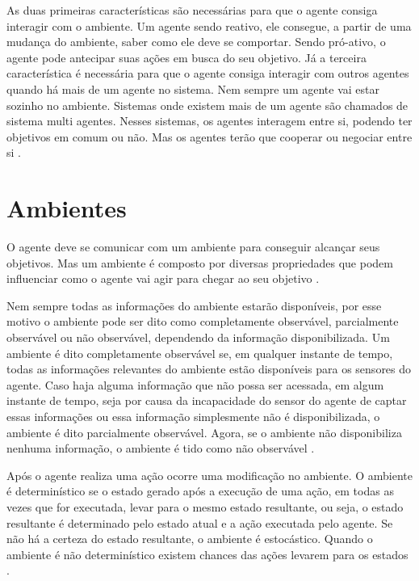 As duas primeiras características são necessárias para que o agente consiga interagir com o ambiente. Um agente sendo reativo, ele consegue, a partir de uma mudança do ambiente, saber como ele deve se comportar. Sendo pró-ativo, o agente pode antecipar suas ações em busca do seu objetivo.
Já a terceira característica é necessária para que o agente consiga interagir com outros agentes quando há mais de um agente no sistema. Nem sempre um agente vai estar sozinho no ambiente. Sistemas onde existem mais de um agente são chamados de sistema multi agentes. Nesses sistemas, os agentes interagem entre si, podendo ter objetivos em comum ou não. Mas os agentes terão que cooperar ou negociar entre si \cite{intelligence2003modern}.

\section{Ambientes}

O agente deve se comunicar com um ambiente para conseguir alcançar seus objetivos. Mas um ambiente é composto por diversas propriedades que podem influenciar como o agente vai agir para chegar ao seu objetivo \cite{intelligence2003modern}. 

Nem sempre todas as informações do ambiente estarão disponíveis, por esse motivo o ambiente pode ser dito como completamente observável, parcialmente observável ou não observável, dependendo da informação disponibilizada. Um ambiente é dito completamente observável se, em qualquer instante de tempo, todas as informações relevantes do ambiente estão disponíveis para os sensores do agente. Caso haja alguma informação que não possa ser acessada, em algum instante de tempo, seja por causa da incapacidade do sensor do agente de captar essas informações ou essa informação simplesmente não é disponibilizada, o ambiente é dito parcialmente observável. Agora, se o ambiente não disponibiliza nenhuma informação, o ambiente é tido como não observável \cite{ intelligence2003modern, agent1999}.   

Após o agente realiza uma ação ocorre uma modificação no ambiente. O ambiente é determinístico se o estado gerado após a execução de uma ação, em todas as vezes que for executada, levar para o mesmo estado resultante, ou seja, o estado resultante é determinado pelo estado atual e a ação executada pelo agente. Se não há a certeza do estado resultante, o ambiente é estocástico. Quando o ambiente  é não determinístico existem chances das ações levarem para os estados \cite{intelligence2003modern}. 

